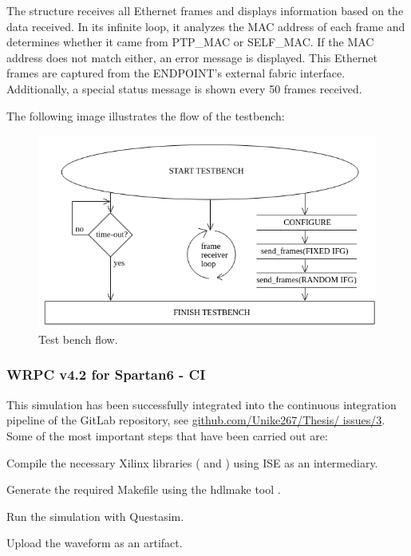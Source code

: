 \noindent The  structure receives all Ethernet frames and displays information based on the data received.
In its infinite loop, it analyzes the MAC address of each frame and determines whether it came from PTP\_MAC or SELF\_MAC.
If the MAC address does not match either, an error message is displayed.
This Ethernet frames are captured from the ENDPOINT’s external fabric interface. 
Additionally, a special status message is shown every 50 frames received.

\vspace{5mm}

\noindent The following image illustrates the flow of the testbench:

\begin{figure}[H]
\centering
\includegraphics[width=14cm]{figures/tb_flow.png}
\caption{Test bench flow.}
\label{fig:tb-flow}
\end{figure}

\newpage 

\subsubsection{WRPC v4.2 for Spartan6 - CI}

\noindent This simulation has been successfully integrated into the continuous integration pipeline of the GitLab repository, see \href{https://github.com/Unike267/Thesis/issues/3}{github.com/Unike267/Thesis/ issues/3}.
Some of the most important steps that have been carried out are:

\begin{dig}
\item Compile the necessary Xilinx libraries ( and ) using ISE as an intermediary.
\item Generate the required Makefile using the hdlmake tool \cite{hdl-make:ohwr}.
\item Run the simulation with Questasim.
\item Upload the waveform as an artifact.
\end{dig}

